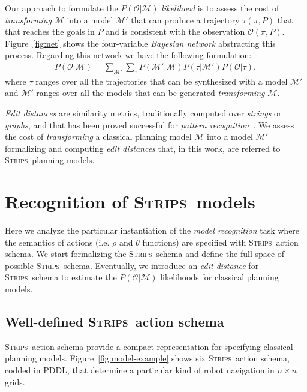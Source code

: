 \documentclass[letterpaper]{article} %
\newcommand{\strips}{\textsc{Strips}}     %
\begin{document}
Our approach to formulate the $P(\mathcal{O}|\mathcal{M})$ {\em likelihood} is to assess the cost of {\em transforming} $\mathcal{M}$ into a model $\mathcal{M'}$ that can produce a trajectory $\tau(\pi,P)$ that that reaches the goals in $P$ and is consistent with the observation $\mathcal{O}(\pi,P)$. Figure~\ref{fig:net} shows the four-variable {\em Bayesian network} abstracting this process. Regarding this network we have the following formulation:
\begin{align}
 P(\mathcal{O}|\mathcal{M})=\sum_{\mathcal{M}'}\sum_{\tau} P(\mathcal{M'}|\mathcal{M})P(\tau|\mathcal{M'})P(\mathcal{O}|\tau),
\end{align}
where $\tau$ ranges over all the trajectories that can be synthesized with a model $\mathcal{M}'$ and $\mathcal{M}'$ ranges over all the models that can be generated {\em transforming} $\mathcal{M}$.

{\em Edit distances} are similarity metrics, traditionally computed over {\em strings} or {\em graphs}, and that has been proved successful for {\em pattern recognition}~\cite{masek1980faster,bunke1997relation}. We assess the cost of {\em transforming} a classical planning model $\mathcal{M}$ into a model $\mathcal{M'}$ formalizing and computing {\em edit distances} that, in this work, are referred to \strips\ planning models. 



\section{Recognition of \strips\ models}
\label{sec:asPlanning}
Here we analyze the particular instantiation of the {\em model recognition} task where the semantics of actions (i.e. $\rho$ and $\theta$ functions) are specified with \strips\ action schema. We start formalizing the \strips\ schema and define the full space of possible \strips\ schema. Eventually, we introduce an {\em edit distance} for \strips\ schema to estimate the $P(\mathcal{O}|\mathcal{M})$ likelihoods for classical planning models.

\subsection{Well-defined \strips\ action schema}
\strips\ action schema provide a compact representation for specifying classical planning models. Figure~\ref{fig:model-example} shows six \strips\ action schema, codded in PDDL, that determine a particular kind of robot navigation in $n\times n$ grids.
\end{document}
